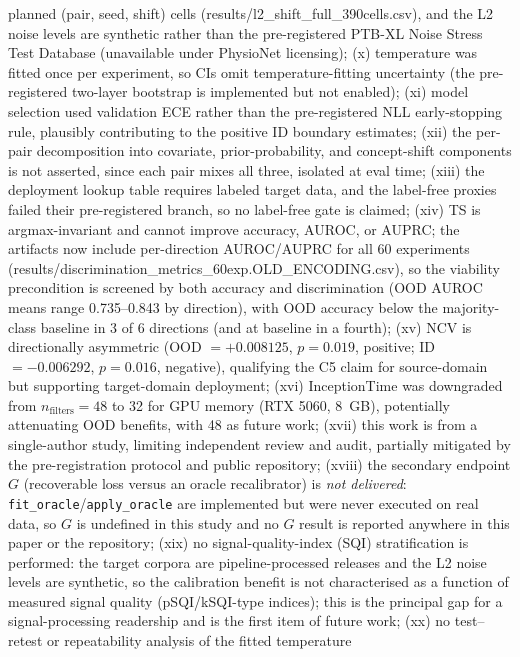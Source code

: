 \documentclass[review,12pt,nonatbib]{elsarticle}
\begin{document}
planned (pair, seed, shift) cells (results/l2\_shift\_full\_390cells.csv),
and the L2 noise
levels are synthetic rather than the pre-registered PTB-XL Noise Stress
Test Database (unavailable under PhysioNet licensing); (x) temperature
was fitted once per experiment, so CIs omit temperature-fitting
uncertainty (the pre-registered two-layer bootstrap is implemented but
not enabled); (xi) model selection used validation ECE rather than the pre-registered
NLL early-stopping rule, plausibly contributing to the positive ID
boundary estimates; (xii) the per-pair decomposition into covariate,
prior-probability, and concept-shift components is not asserted, since
each pair mixes all three, isolated at eval time; (xiii) the deployment
lookup table requires labeled target data, and the label-free proxies
failed their pre-registered branch, so no label-free gate is claimed;
(xiv) TS is argmax-invariant and cannot improve accuracy, AUROC, or
AUPRC; the artifacts now include per-direction AUROC/AUPRC for all 60
experiments (results/discrimination\_metrics\_60exp.OLD\_ENCODING.csv), so the
viability precondition is screened by both accuracy and discrimination
(OOD AUROC means range 0.735--0.843 by direction), with OOD accuracy
below the majority-class baseline in 3 of 6 directions (and at baseline
in a fourth);
(xv) NCV is directionally asymmetric (OOD $= +0.008125$, $p = 0.019$,
positive; ID $= -0.006292$, $p = 0.016$, negative), qualifying the C5
claim for source-domain but supporting target-domain deployment; (xvi)
InceptionTime was downgraded from $n_{\text{filters}}=48$ to 32 for GPU
memory (RTX 5060, 8~GB), potentially attenuating OOD benefits, with 48
as future work; (xvii) this work is from a single-author
study, limiting independent review and audit, partially mitigated by the
pre-registration protocol and public repository; (xviii) the secondary
endpoint $G$ (recoverable loss versus an oracle recalibrator) is
\emph{not delivered}: \texttt{fit\_oracle}/\texttt{apply\_oracle} are
implemented but were never executed on real data, so $G$ is undefined in
this study and no $G$ result is reported anywhere in this paper or the
repository; (xix) no signal-quality-index (SQI) stratification is
performed: the target corpora are pipeline-processed releases and the L2
noise levels are synthetic, so the calibration benefit is not
characterised as a function of measured signal quality
(pSQI/kSQI-type indices); this is the principal gap for a
signal-processing readership and is the first item of future work;
(xx) no test--retest or repeatability analysis of the fitted temperature
\end{document}
